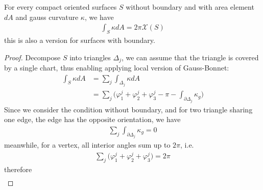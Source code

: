 \documentclass[10pt]{article}
\begin{document}
            \begin{theorem}
                For every compact oriented surfaces $S$ without boundary and with area element $dA$ and gauss curvature $\kappa$, we have
                \begin{equation*}
                    \begin{aligned}
                        \int_S\kappa dA = 2\pi \mathcal{X}(S)
                    \end{aligned}
                \end{equation*}
                this is also a version for surfaces with boundary.
            \end{theorem}
            \begin{proof}
                Decompose $S$ into triangles $\Delta_j$, we can assume that the triangle is covered by a single chart, thus enabling applying local version of Gauss-Bonnet:
                \begin{equation*}
                    \begin{aligned}
                        \int_S\kappa dA &= \sum\limits_j\int_{\Delta_j}\kappa dA \\
                        &= \sum\limits_j\bigg( \varphi_1^j + \varphi_2^j +\varphi_3^j - \pi - \int_{\partial\Delta_j}\kappa_g \bigg)
                    \end{aligned}
                \end{equation*}
                Since we consider the condition without boundary, and for two triangle sharing one edge, the edge has the opposite orientation, we have
                \begin{equation*}
                    \begin{aligned}
                        \sum\limits_j\int_{\partial\Delta_j}\kappa_g = 0
                    \end{aligned}
                \end{equation*}
                meanwhile, for a vertex, all interior angles sum up to $2\pi$, i.e.
                \begin{equation*}
                    \begin{aligned}
                        \sum\limits_j\big( \varphi_1^j + \varphi_2^j +\varphi_3^j\big) = 2\pi
                    \end{aligned}
                \end{equation*}
                therefore
                \begin{equation*}
                    \begin{aligned}

\end{aligned}
\end{equation*}
\end{proof}
\end{document}
